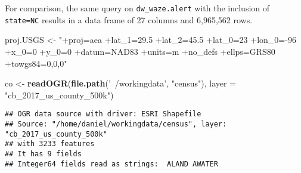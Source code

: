 \documentclass[]{article}
\newenvironment{Shaded}{\begin{snugshade}}{\end{snugshade}}
\newcommand{\DataTypeTok}[1]{\textcolor[rgb]{0.13,0.29,0.53}{#1}}
\newcommand{\KeywordTok}[1]{\textcolor[rgb]{0.13,0.29,0.53}{\textbf{#1}}}
\newcommand{\NormalTok}[1]{#1}
\newcommand{\StringTok}[1]{\textcolor[rgb]{0.31,0.60,0.02}{#1}}
\begin{document}
For comparison, the same query on \texttt{dw\_waze.alert} with the
inclusion of \texttt{state=NC} results in a data frame of 27 columns and
6,965,562 rows.

\begin{Shaded}
\begin{Highlighting}[]
\NormalTok{proj.USGS <-}\StringTok{ "+proj=aea +lat_1=29.5 +lat_2=45.5 +lat_0=23 +lon_0=-96 +x_0=0 +y_0=0 +datum=NAD83 +units=m +no_defs +ellps=GRS80 +towgs84=0,0,0"}

\NormalTok{co <-}\StringTok{ }\KeywordTok{readOGR}\NormalTok{(}\KeywordTok{file.path}\NormalTok{(}\StringTok{'~/workingdata'}\NormalTok{, }\StringTok{"census"}\NormalTok{), }\DataTypeTok{layer =} \StringTok{"cb_2017_us_county_500k"}\NormalTok{)}
\end{Highlighting}
\end{Shaded}

\begin{verbatim}
## OGR data source with driver: ESRI Shapefile 
## Source: "/home/daniel/workingdata/census", layer: "cb_2017_us_county_500k"
## with 3233 features
## It has 9 fields
## Integer64 fields read as strings:  ALAND AWATER
\end{verbatim}
\end{document}

